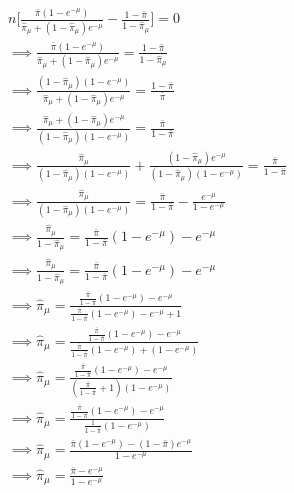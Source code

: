\documentclass[
  12pt]{article}
\begin{document}
\[
\begin{aligned}
&n \Bigg[\frac{\bar{\pi}(1 - e^{-\mu})}{\hat{\pi}_{\mu} + (1-\hat{\pi}_{\mu})e^{-\mu}} - \frac{1 - \bar{\pi}}{1 - \hat{\pi}_{\mu}} \Bigg] = 0 \\
&\implies \frac{\bar{\pi}(1 - e^{-\mu})}{\hat{\pi}_{\mu} + (1-\hat{\pi}_{\mu})e^{-\mu}} = \frac{1 - \bar{\pi}}{1 - \hat{\pi}_{\mu}}  \\
&\implies \frac{(1 - \hat{\pi}_{\mu})(1 - e^{-\mu})}{\hat{\pi}_{\mu} + (1-\hat{\pi}_{\mu})e^{-\mu}} = \frac{1 - \bar{\pi}}{\bar{\pi}} \\
&\implies \frac{\hat{\pi}_{\mu} + (1-\hat{\pi}_{\mu})e^{-\mu}}{(1 - \hat{\pi}_{\mu})(1 - e^{-\mu})} = \frac{\bar{\pi}}{1 - \bar{\pi}} \\
&\implies \frac{\hat{\pi}_{\mu}}{(1 - \hat{\pi}_{\mu})(1 - e^{-\mu})} + \frac{(1-\hat{\pi}_{\mu})e^{-\mu}}{(1 - \hat{\pi}_{\mu})(1 - e^{-\mu})} = \frac{\bar{\pi}}{1 - \bar{\pi}} \\
&\implies \frac{\hat{\pi}_{\mu}}{(1 - \hat{\pi}_{\mu})(1 - e^{-\mu})} = \frac{\bar{\pi}}{1 - \bar{\pi}} - \frac{e^{-\mu}}{1 - e^{-\mu}} \\
&\implies \frac{\hat{\pi}_{\mu}}{1 - \hat{\pi}_{\mu}} = \frac{\bar{\pi}}{1 - \bar{\pi}}(1 - e^{-\mu}) - e^{-\mu} \\
&\implies \frac{\hat{\pi}_{\mu}}{1 - \hat{\pi}_{\mu}} = \frac{\bar{\pi}}{1 - \bar{\pi}}(1 - e^{-\mu}) - e^{-\mu} \\
&\implies \hat{\pi}_{\mu} = \frac{\frac{\bar{\pi}}{1 - \bar{\pi}}(1 - e^{-\mu}) - e^{-\mu}}{\frac{\bar{\pi}}{1 - \bar{\pi}}(1 - e^{-\mu}) - e^{-\mu} + 1} \\
&\implies \hat{\pi}_{\mu} = \frac{\frac{\bar{\pi}}{1 - \bar{\pi}}(1 - e^{-\mu}) - e^{-\mu}}{\frac{\bar{\pi}}{1 - \bar{\pi}}(1 - e^{-\mu}) + (1 - e^{-\mu})} \\
&\implies \hat{\pi}_{\mu} = \frac{\frac{\bar{\pi}}{1 - \bar{\pi}}(1 - e^{-\mu}) - e^{-\mu}}{(\frac{\bar{\pi}}{1 - \bar{\pi}} + 1)(1 - e^{-\mu})} \\
&\implies \hat{\pi}_{\mu} = \frac{\frac{\bar{\pi}}{1 - \bar{\pi}}(1 - e^{-\mu}) - e^{-\mu}}{\frac{1}{1 - \bar{\pi}}(1 - e^{-\mu})} \\
&\implies \hat{\pi}_{\mu} = \frac{\bar{\pi}(1 - e^{-\mu}) - (1 - \bar{\pi})e^{-\mu}}{1 - e^{-\mu}} \\
&\implies \hat{\pi}_{\mu} = \frac{\bar{\pi} - e^{-\mu}}{1 - e^{-\mu}} \\
\end{aligned}
\]


  
\end{document}
